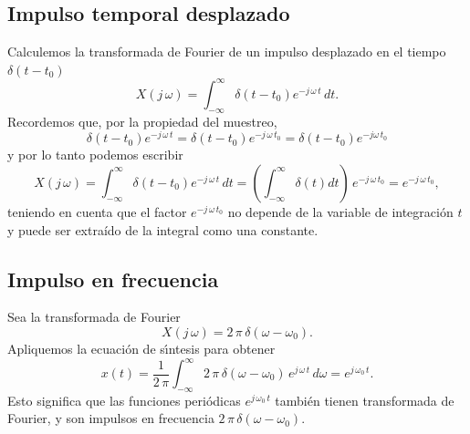 \subsection{Impulso temporal desplazado}

Calculemos la transformada de Fourier de un impulso desplazado en el 
tiempo $\delta \left( t - t_{0}\right) $
\begin{equation}
        X\left( j \, \omega \right) =
                \int_{-\infty }^{\infty }\delta \left( t - t_{0} \right)e^{-j \, \omega \, t} \, dt.
\end{equation}
Recordemos que, por la propiedad del muestreo,
\begin{equation}
\delta \left( t - t_{0} \right) e^{-j \, \omega \, t}=
        \delta \left( t - t_{0} \right) e^{-j \, \omega \, t_{0}} =
                \delta \left( t - t_{0} \right) e^{-j \omega \, t_{0}}
\end{equation}
y por lo tanto  podemos escribir
\begin{equation}
X\left( j \, \omega \right) =
        \int_{-\infty }^{\infty }\delta \left( t - t_{0} \right)e^{-j \, \omega \, t} \, dt=
        \left(\int_{-\infty }^{\infty }\delta \left( t\right) dt\right) \, e^{-j \, \omega \, t_{0}} = e^{-j \, \omega \, t_{0}},
\end{equation}
teniendo en cuenta que el factor $e^{-j \, \omega \, t_{0}}$ no depende de la variable de integración $t$ y puede ser extraído de la integral como una constante.


\subsection{Impulso en frecuencia}

Sea la transformada de Fourier 
\begin{equation}
        X\left( j \, \omega \right) =2 \, \pi \, \delta \left( \omega -\omega _{0}\right) .
\end{equation}
Apliquemos la ecuaci\'{o}n de s\'{\i}ntesis para obtener 
\begin{equation}
        x\left( t\right) =
          \frac{1}{2 \, \pi }
           \int_{-\infty }^{\infty }
               2 \, \pi \, \delta \left(\omega -\omega _{0}\right) \, e^{j \, \omega \, t} \, d\omega = e^{j \, \omega _{0} \, t}.
\end{equation}
Esto significa que las funciones periódicas $e^{j \, \omega _{0} \, t}$ también tienen transformada de Fourier, y son impulsos en frecuencia $2 \, \pi \, \delta \left( \omega -\omega _{0}\right)$.

